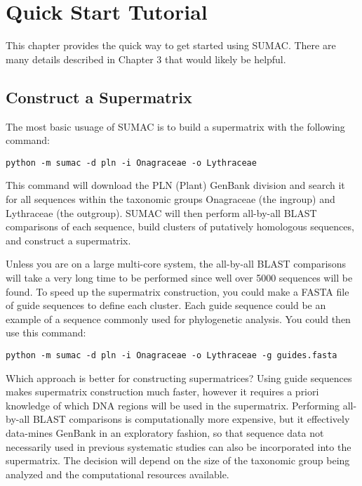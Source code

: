 \documentclass[12pt]{report}
\begin{document}

\chapter{Quick Start Tutorial}

This chapter provides the quick way to get started using SUMAC. 
There are many details described in Chapter 3 that
would likely be helpful.

\section{Construct a Supermatrix}

The most basic usuage of SUMAC is to build a supermatrix with the following
command:

\begin{verbatim}
python -m sumac -d pln -i Onagraceae -o Lythraceae
\end{verbatim}

This command will download the PLN
(Plant) GenBank division and search it for all sequences within
the taxonomic groups Onagraceae (the ingroup) and Lythraceae (the outgroup).
SUMAC will then perform all-by-all BLAST comparisons of each sequence, 
build clusters of putatively homologous sequences, and 
construct a supermatrix. 

Unless you are on a large multi-core system, the all-by-all BLAST comparisons
will take a very long time to be performed since well over 5000 sequences
will be found.
To speed up the supermatrix construction, you could make a FASTA file
of guide sequences to define each cluster. Each guide
sequence could be an example of a sequence commonly used for phylogenetic
analysis. 
You could then use this command:

\begin{verbatim}
python -m sumac -d pln -i Onagraceae -o Lythraceae -g guides.fasta
\end{verbatim}

Which approach is better for constructing supermatrices?
Using guide sequences makes supermatrix construction much faster, however
it requires a priori knowledge of which DNA regions will be used
in the supermatrix.
Performing all-by-all BLAST comparisons is computationally
more expensive, but it effectively data-mines GenBank in an exploratory
fashion, so that sequence data not necessarily used in previous systematic
studies can also be incorporated into the supermatrix.
The decision will depend on the size of the taxonomic group being
analyzed and the computational resources available.
\end{document}
